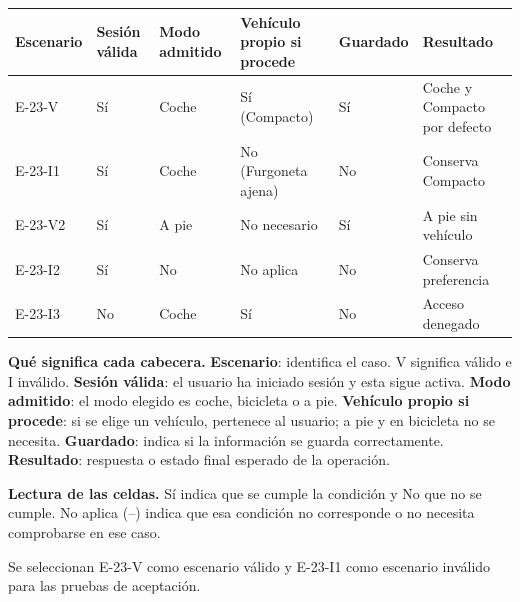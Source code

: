\begingroup\fontsize{7.8}{11}\selectfont\setlength{\tabcolsep}{3pt}
\begin{tabularx}{\linewidth}{@{}*{6}{Y}@{}}\toprule
\textbf{Escenario} & \textbf{Sesión válida} & \textbf{Modo admitido} & \textbf{Vehículo propio si procede} & \textbf{Guardado} & \textbf{Resultado}\\\midrule
E-23-V & Sí & Coche & Sí (Compacto) & Sí & Coche y Compacto por defecto\\[3pt]
E-23-I1 & Sí & Coche & No (Furgoneta ajena) & No & Conserva Compacto\\[3pt]
E-23-V2 & Sí & A pie & No necesario & Sí & A pie sin vehículo\\[3pt]
E-23-I2 & Sí & No & No aplica & No & Conserva preferencia\\[3pt]
E-23-I3 & No & Coche & Sí & No & Acceso denegado\\[3pt]
\bottomrule\end{tabularx}\endgroup\par
{\fontsize{9}{11}\selectfont\textbf{Qué significa cada cabecera.} \textbf{Escenario}: identifica el caso. V significa válido e I inválido. \textbf{Sesión válida}: el usuario ha iniciado sesión y esta sigue activa. \textbf{Modo admitido}: el modo elegido es coche, bicicleta o a pie. \textbf{Vehículo propio si procede}: si se elige un vehículo, pertenece al usuario; a pie y en bicicleta no se necesita. \textbf{Guardado}: indica si la información se guarda correctamente. \textbf{Resultado}: respuesta o estado final esperado de la operación.\par\textbf{Lectura de las celdas.} Sí indica que se cumple la condición y No que no se cumple. No aplica (--) indica que esa condición no corresponde o no necesita comprobarse en ese caso.\par}


Se seleccionan E-23-V como escenario válido y E-23-I1 como escenario inválido para las pruebas de aceptación.\par



